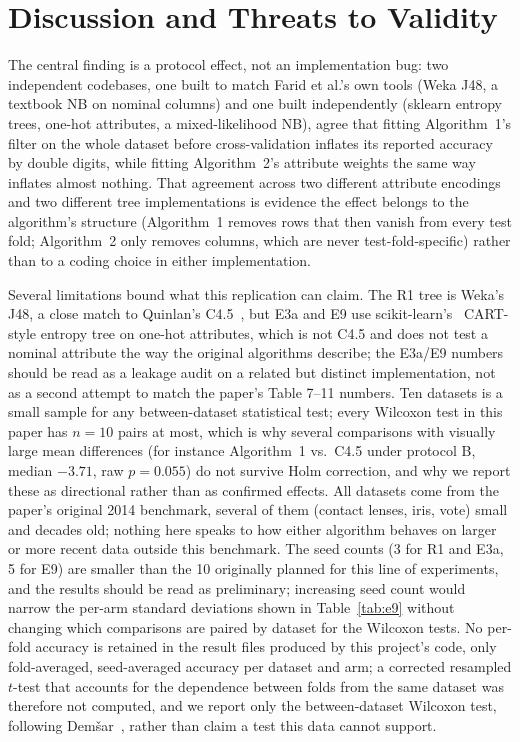 \section{Discussion and Threats to Validity}

The central finding is a protocol effect, not an implementation bug: two
independent codebases, one built to match Farid et al.'s own tools (Weka
J48, a textbook NB on nominal columns) and one built independently
(sklearn entropy trees, one-hot attributes, a mixed-likelihood NB), agree
that fitting Algorithm~1's filter on the whole dataset before
cross-validation inflates its reported accuracy by double digits, while
fitting Algorithm~2's attribute weights the same way inflates almost
nothing. That agreement across two different attribute encodings and two
different tree implementations is evidence the effect belongs to the
algorithm's structure (Algorithm~1 removes rows that then vanish from
every test fold; Algorithm~2 only removes columns, which are never
test-fold-specific) rather than to a coding choice in either
implementation.

Several limitations bound what this replication can claim. The R1 tree is
Weka's J48, a close match to Quinlan's C4.5~\cite{quinlan1993c45}, but E3a
and E9 use scikit-learn's~\cite{pedregosa2011scikit} CART-style entropy
tree on one-hot attributes, which is not C4.5 and does not test a nominal
attribute the way the original algorithms describe; the E3a/E9 numbers
should be read as a leakage audit on a related but distinct
implementation, not as a second attempt to match the paper's Table 7--11
numbers. Ten datasets is a small sample for any between-dataset
statistical test; every Wilcoxon test in this paper has $n=10$ pairs at
most, which is why several comparisons with visually large mean
differences (for instance Algorithm~1 vs.\ C4.5 under protocol B, median
$-3.71$, raw $p=0.055$) do not survive Holm correction, and why we report
these as directional rather than as confirmed effects. All datasets come
from the paper's original 2014 benchmark, several of them (contact lenses,
iris, vote) small and decades old; nothing here speaks to how either
algorithm behaves on larger or more recent data outside this
benchmark. The seed counts (3 for R1 and E3a, 5 for E9) are smaller than
the 10 originally planned for this line of experiments, and the results
should be read as preliminary; increasing seed count would narrow the
per-arm standard deviations shown in Table~\ref{tab:e9} without changing
which comparisons are paired by dataset for the Wilcoxon tests. No
per-fold accuracy is retained in the result files produced by this
project's code, only fold-averaged, seed-averaged accuracy per dataset and
arm; a corrected resampled $t$-test that accounts for the dependence
between folds from the same dataset was therefore not computed, and we
report only the between-dataset Wilcoxon test, following
Dem\v{s}ar~\cite{demsar2006statistical}, rather than claim a test this
data cannot support.


